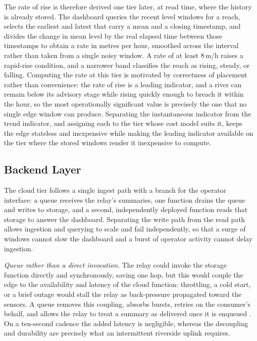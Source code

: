 \documentclass[conference]{IEEEtran}
\begin{document}
The rate of rise is therefore derived one tier later, at read time, where the history is already stored. The dashboard queries the recent level windows for a reach, selects the earliest and latest that carry a mean and a closing timestamp, and divides the change in mean level by the real elapsed time between those timestamps to obtain a rate in metres per hour, smoothed across the interval rather than taken from a single noisy window. A rate of at least 8\,m/h raises a rapid-rise condition, and a narrower band classifies the reach as rising, steady, or falling. Computing the rate at this tier is motivated by correctness of placement rather than convenience: the rate of rise is a leading indicator, and a river can remain below its advisory stage while rising quickly enough to breach it within the hour, so the most operationally significant value is precisely the one that no single edge window can produce. Separating the instantaneous indicator from the trend indicator, and assigning each to the tier whose cost model suits it, keeps the edge stateless and inexpensive while making the leading indicator available on the tier where the stored windows render it inexpensive to compute.

\subsection{Backend Layer}

The cloud tier follows a single ingest path with a branch for the operator interface: a queue receives the relay's summaries, one function drains the queue and writes to storage, and a second, independently deployed function reads that storage to answer the dashboard. Separating the write path from the read path allows ingestion and querying to scale and fail independently, so that a surge of windows cannot slow the dashboard and a burst of operator activity cannot delay ingestion.

\textit{Queue rather than a direct invocation.} The relay could invoke the storage function directly and synchronously, saving one hop, but this would couple the edge to the availability and latency of the cloud function: throttling, a cold start, or a brief outage would stall the relay as back-pressure propagated toward the sensors. A queue removes this coupling, absorbs bursts, retries on the consumer's behalf, and allows the relay to treat a summary as delivered once it is enqueued \cite{hohpe2003}. On a ten-second cadence the added latency is negligible, whereas the decoupling and durability are precisely what an intermittent riverside uplink requires.
\end{document}
